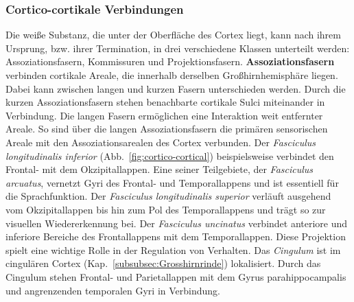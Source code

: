 \subsubsection*{Cortico-cortikale Verbindungen}
\label{subsubsec:cortico-cortical}

Die weiße Substanz, die unter der Oberfläche des Cortex liegt, kann nach ihrem Ursprung, bzw. ihrer Termination, in drei verschiedene Klassen unterteilt werden: Assoziationsfasern, Kommissuren und Projektionsfasern.
\textbf{Assoziationsfasern} verbinden cortikale Areale, die innerhalb derselben Großhirnhemisphäre liegen. Dabei kann zwischen langen und kurzen Fasern unterschieden werden. Durch die kurzen Assoziationsfasern stehen benachbarte cortikale Sulci miteinander in Verbindung. Die langen Fasern ermöglichen eine Interaktion weit entfernter Areale. So sind über die langen Assoziationsfasern die primären sensorischen Areale mit den Assoziationsarealen des Cortex verbunden. Der \textit{Fasciculus longitudinalis inferior} (Abb.~\ref{fig:cortico-cortical}) beispielsweise verbindet den Frontal- mit dem Okzipitallappen. Eine seiner Teilgebiete, der \textit{Fasciculus arcuatus}, vernetzt Gyri des Frontal- und Temporallappens und ist essentiell für die Sprachfunktion. Der \textit{Fasciculus longitudinalis superior} verläuft ausgehend vom Okzipitallappen bis hin zum Pol des Temporallappens und trägt so zur visuellen Wiedererkennung bei. Der \textit{Fasciculus uncinatus} verbindet anteriore und inferiore Bereiche des Frontallappens mit dem Temporallappen. Diese Projektion spielt eine wichtige Rolle in der Regulation von Verhalten. Das \textit{Cingulum} ist im cingulären Cortex (Kap.~\ref{subsubsec:Grosshirnrinde}) lokalisiert. Durch das Cingulum stehen Frontal- und Parietallappen mit dem Gyrus parahippocampalis und angrenzenden temporalen Gyri in Verbindung.

